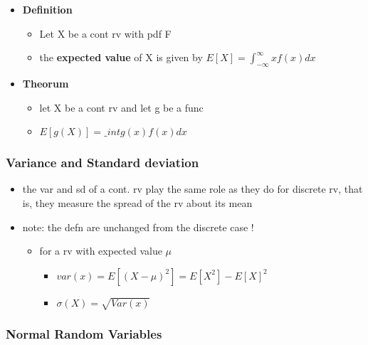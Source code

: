\documentclass[
]{article}
\providecommand{\tightlist}{%
  \setlength{\itemsep}{0pt}\setlength{\parskip}{0pt}}
\begin{document}
\begin{itemize}
\tightlist
\item
  \textbf{Definition}

  \begin{itemize}
  \tightlist
  \item
    Let X be a cont rv with pdf F
  \item
    the \textbf{expected value} of X is given by
    \(E[X] = \int_{-\infty}^{\infty}xf(x)dx\)
  \end{itemize}
\item
  \textbf{Theorum}

  \begin{itemize}
  \tightlist
  \item
    let X be a cont rv and let g be a func
  \item
    \(E[g(X)] = \_int g(x)f(x)dx\)
  \end{itemize}
\end{itemize}

\hypertarget{variance-and-standard-deviation}{%
\subsubsection{Variance and Standard
deviation}\label{variance-and-standard-deviation}}

\begin{itemize}
\tightlist
\item
  the var and sd of a cont. rv play the same role as they do for
  discrete rv, that is, they measure the spread of the rv about its mean
\item
  note: the defn are unchanged from the discrete case !

  \begin{itemize}
  \tightlist
  \item
    for a rv with expected value \(\mu\)

    \begin{itemize}
    \tightlist
    \item
      \(var(x) = E[(X - \mu)^2] = E[X^2] - E[X]^2\)
    \item
      \(\sigma (X) = \sqrt{Var(x)}\)
    \end{itemize}
  \end{itemize}
\end{itemize}

\hypertarget{normal-random-variables}{%
\subsubsection{Normal Random Variables}\label{normal-random-variables}}
\end{document}

